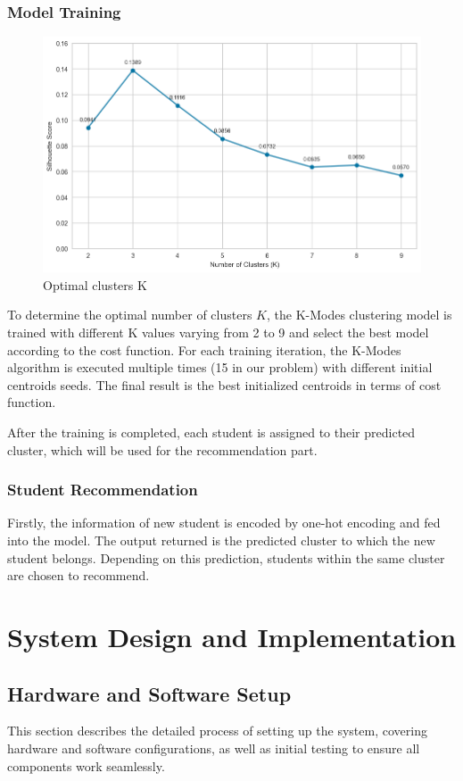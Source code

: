 \documentclass[12pt]{article}
\begin{document}
\subsubsection{Model Training}
\begin{figure}[H]
    \centering
    \includegraphics[width=0.7\linewidth]{image/choosing_K.png}
    \caption{Optimal clusters K}
    \label{fig:choosing_K}
\end{figure}

To determine the optimal number of clusters $K$, the K-Modes clustering model is trained with different K values varying from 2 to 9 and select the best model according to the cost function. For each training iteration, the K-Modes algorithm is executed multiple times (15 in our problem) with different initial centroids seeds. The final result is the best initialized centroids in terms of cost function.\citep{devos2015}

After the training is completed, each student is assigned to their predicted cluster, which will be used for the recommendation part.

\subsubsection{Student Recommendation}
Firstly, the information of new student is encoded by one-hot encoding and fed into the model. The output returned is the predicted cluster to which the new student belongs. Depending on this prediction, students within the same cluster are chosen to recommend.

\section{System Design and Implementation}  

\subsection{Hardware and Software Setup}  
This section describes the detailed process of setting up the system, covering hardware and software configurations, as well as initial testing to ensure all components work seamlessly.
\end{document}
